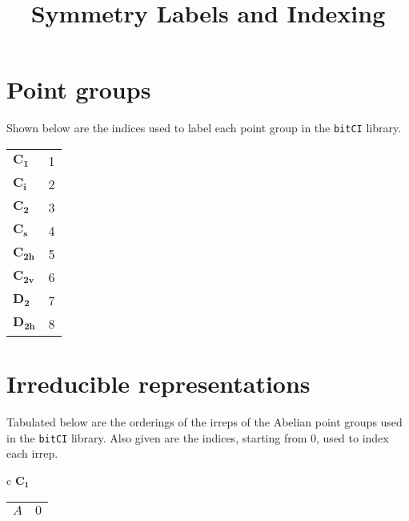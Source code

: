 \documentclass[12pt]{article}
\newcommand*\code[1]{\mbox{\texttt{{#1}}}}
\begin{document}
\predate{}
\postdate{}

\author{}
\title{Symmetry Labels and Indexing}
\date{} %

\maketitle

\section{Point groups}
Shown below are the indices used to label each point group in the
\code{bitCI} library.

\vspace{1cm}

\begin{tabular}{|l|l|}
  \hline
  $\mathbf{C_{1}}$ & 1 \\
  $\mathbf{C_{i}}$ & 2 \\
  $\mathbf{C_{2}}$ & 3 \\
  $\mathbf{C_{s}}$ & 4 \\
  $\mathbf{C_{2h}}$ & 5 \\
  $\mathbf{C_{2v}}$ & 6 \\
  $\mathbf{D_{2}}$  & 7 \\
  $\mathbf{D_{2h}}$ & 8 \\
  \hline
\end{tabular}

\section{Irreducible representations}

\noindent
Tabulated below are the orderings of the irreps of the Abelian point
groups used in the \code{bitCI} library. Also given are the indices,
starting from $0$, used to index each irrep.

\vspace{1cm}

\begin{tabular}{c}
  $\mathbf{C_{1}}$ \\
  \begin{tabular}{|c|c|}
    \hline
    $A$ & $0$ \\
    \hline
  \end{tabular} \\
\end{tabular}

\vspace{1cm}
\end{document}
